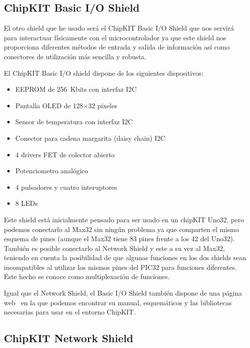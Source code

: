 
\subsection{ChipKIT Basic I/O Shield}
El otro shield que he usado será el ChipKIT Basic I/O Shield que nos servirá para interactuar físicamente con el microcontrolador ya que este shield nos proporciona diferentes métodos de entrada y salida de información así como conectores de utilización más sencilla y robusta.


El ChipKIT Basic I/O shield dispone de los siguientes dispositivos:
\begin{itemize}
	\item EEPROM de 256~Kbits con interfaz I2C
	\item Pantalla OLED de 128$\times$32 píxeles
	\item Sensor de temperatura con interfaz I2C
	\item Conector para cadena margarita (daisy chain) I2C
	\item 4 drivers FET de colector abierto
	\item Potenciometro analógico
	\item 4 pulsadores y cuatro interuptores
	\item 8 LEDs
\end{itemize}

Este shield está inicialmente pensado para ser usado en un chipKIT Uno32, pero podemos conectarlo al Max32 sin ningún problema ya que comparten el mismo esquema de pines (aunque el Max32 tiene 83 pines frente a los 42 del Uno32). También es posible conectarlo al Network Shield y este a su vez al Max32, teniendo en cuenta la posibilidad de que algunas funciones en los dos shields sean incompatibles al utilizar los mismos pines del PIC32 para funciones diferentes. Este hecho se conoce como multiplexación de funciones.

Igual que el Network Shield, el Basic I/O Shield también dispone de una página web~\cite{website:io_shield} en la que podemos encontrar su manual, esquemáticos y las bibliotecas necesarias para usar en el entorno ChipKIT.\@
\subsection{ChipKIT Network Shield}


